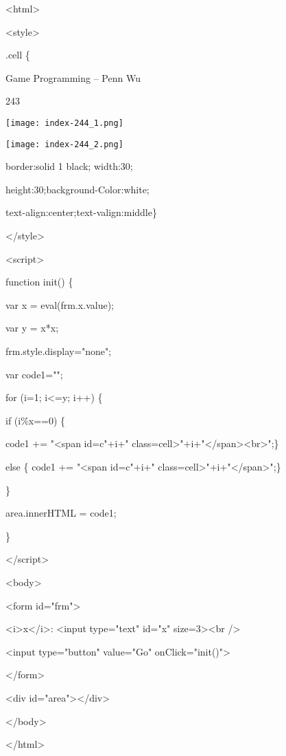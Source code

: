 \documentclass[
]{article}
\begin{document}
\textless html\textgreater{}

\textless style\textgreater{}

.cell \{

Game Programming -- Penn Wu

243

\protect\hypertarget{index_split_012.htmlux5cux23p244}{}{}\texttt{[image: index-244\_1.png]}

\texttt{[image: index-244\_2.png]}

border:solid 1 black; width:30;

height:30;background-Color:white;

text-align:center;text-valign:middle\}

\textless/style\textgreater{}

\textless script\textgreater{}

function init() \{

var x = eval(frm.x.value);

var y = x*x;

frm.style.display="none";

var code1="";

for (i=1; i\textless=y; i++) \{

if (i\%x==0) \{

code1 += "\textless span id=c"+i+"
class=\textquotesingle cell\textquotesingle\textgreater"+i+"\textless/span\textgreater\textless br\textgreater";\}

else \{ code1 += "\textless span id=c"+i+"
class=\textquotesingle cell\textquotesingle\textgreater"+i+"\textless/span\textgreater";\}

\}

area.innerHTML = code1;

\}

\textless/script\textgreater{}

\textless body\textgreater{}

\textless form id="frm"\textgreater{}

\textless i\textgreater x\textless/i\textgreater: \textless input
type="text" id="x" size=3\textgreater\textless br /\textgreater{}

\textless input type="button" value="Go" onClick="init()"\textgreater{}

\textless/form\textgreater{}

\textless div id="area"\textgreater\textless/div\textgreater{}

\textless/body\textgreater{}

\textless/html\textgreater{}
\end{document}
